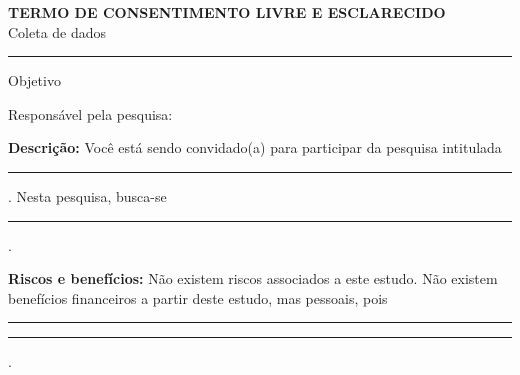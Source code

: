 
\begin{center}
    {\large\bfseries TERMO DE CONSENTIMENTO LIVRE E ESCLARECIDO}\\[4pt]
    Coleta de dados\\[2pt]
    \rule{\textwidth}{0.8pt}
\end{center}

\vspace{0.2cm}

Objetivo

\vspace{0.1cm}

\noindent
\fbox{\parbox{\dimexpr\textwidth-2\fboxsep-2\fboxrule}{%
\vspace{0.8cm}
\docobjetivo
\vspace{0.8cm}
}}

\vspace{0.25cm}

Responsável pela pesquisa:

\vspace{0.1cm}

\noindent
\fbox{\parbox{\dimexpr\textwidth-2\fboxsep-2\fboxrule}{%
\vspace{0.3cm}
\docresponsavel
\vspace{0.3cm}
}}

\vspace{0.25cm}

\noindent
\textbf{Descrição:} Você está sendo convidado(a) para participar da pesquisa intitulada\par
\noindent
\rule{8.5cm}{0.4pt}. Nesta pesquisa, busca-se\par
\noindent
\rule{\dimexpr\textwidth-0.5cm}{0.4pt}.

\vspace{0.15cm}

\noindent
\textbf{Riscos e benefícios:} Não existem riscos associados a este estudo. Não existem benefícios
financeiros a partir deste estudo, mas pessoais, pois \hrulefill\par
\noindent
\rule{5.5cm}{0.4pt}\hspace{0.5cm}\rule{5.5cm}{0.4pt}.

